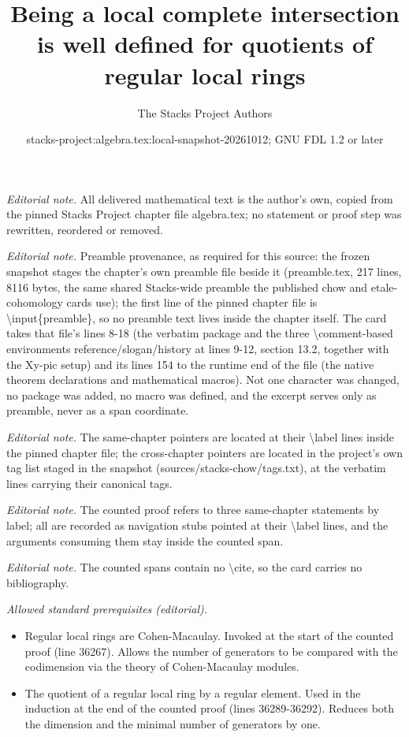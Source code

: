 \documentclass[10pt,a4paper]{amsart}
\title{Being a local complete intersection is well defined for quotients of regular local rings}
\author{The Stacks Project Authors}
\date{stacks-project:algebra.tex:local-snapshot-20261012; GNU FDL 1.2 or later}
\theoremstyle{plain}
\theoremstyle{definition}
\theoremstyle{remark}
\numberwithin{equation}{subsection}
\begin{document}
\maketitle
\noindent\textit{Editorial note.} All delivered mathematical text is the author's own, copied from the pinned Stacks Project chapter file algebra.tex; no statement or proof step was rewritten, reordered or removed.\par\medskip
\noindent\textit{Editorial note.} Preamble provenance, as required for this source: the frozen snapshot stages the chapter's own preamble file beside it (preamble.tex, 217 lines, 8116 bytes, the same shared Stacks-wide preamble the published chow and etale-cohomology cards use); the first line of the pinned chapter file is \textbackslash{}input\{preamble\}, so no preamble text lives inside the chapter itself. The card takes that file's lines 8-18 (the verbatim package and the three \textbackslash{}comment-based environments reference/slogan/history at lines 9-12, section 13.2, together with the Xy-pic setup) and its lines 154 to the runtime end of the file (the native theorem declarations and mathematical macros). Not one character was changed, no package was added, no macro was defined, and the excerpt serves only as preamble, never as a span coordinate.\par\medskip
\noindent\textit{Editorial note.} The same-chapter pointers are located at their \textbackslash{}label lines inside the pinned chapter file; the cross-chapter pointers are located in the project's own tag list staged in the snapshot (sources/stacks-chow/tags.txt), at the verbatim lines carrying their canonical tags.\par\medskip
\noindent\textit{Editorial note.} The counted proof refers to three same-chapter statements by label; all are recorded as navigation stubs pointed at their \textbackslash{}label lines, and the arguments consuming them stay inside the counted span.\par\medskip
\noindent\textit{Editorial note.} The counted spans contain no \textbackslash{}cite, so the card carries no bibliography.\par\medskip
\noindent\textit{Allowed standard prerequisites (editorial).}\begin{itemize}
\item Regular local rings are Cohen-Macaulay. Invoked at the start of the counted proof (line 36267). Allows the number of generators to be compared with the codimension via the theory of Cohen-Macaulay modules.
\item The quotient of a regular local ring by a regular element. Used in the induction at the end of the counted proof (lines 36289-36292). Reduces both the dimension and the minimal number of generators by one.
\end{itemize}\medskip
\end{document}
